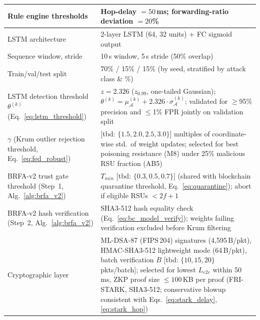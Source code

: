 \documentclass[12pt, a4paper]{report}
\begin{document}
{{\begin{longtable}{|m{5.0cm}|m{9.0cm}|}
            \hline
            Rule engine thresholds & Hop-delay $= 50$\,ms; forwarding-ratio deviation $= 20$\% \\
            \hline
            LSTM architecture & 2-layer LSTM (64, 32 units) + FC sigmoid output \\
            \hline
            Sequence window, stride & 10\,s window, 5\,s stride (50\% overlap) \\
            \hline
            Train/val/test split & 70\% / 15\% / 15\% (by seed, stratified by attack class \& \%) \\
            \hline
            LSTM detection threshold $\theta^{(k)}$ (Eq.~\ref{eq:lstm_threshold}) &
            $z = 2.326$ ($z_{0.99}$, one-tailed Gaussian); $\theta^{(k)} = \mu_{\mathcal{A}}^{(k)} + 2.326 \cdot \sigma_{\mathcal{A}}^{(k)}$;
            validated for $\geq$95\% precision and $\leq$1\% FPR jointly on validation split \\            
            \hline
              $\gamma$ (Krum outlier rejection threshold, Eq.~\ref{eq:fed_robust}) & [tbd: $\{1.5, 2.0, 2.5, 3.0\}$] multiples of coordinate-wise std.\ of weight updates;   selected for best poisoning resistance (M8) under 25\% malicious RSU fraction (AB5) \\
            \hline
              BRFA-v2 trust gate threshold (Step~1, Alg.~\ref{alg:brfa_v2}) &              $T_{min}$ [tbd: $\{0.3, 0.5, 0.7\}$] (shared with blockchain quarantine threshold, Eq.~\ref{eq:quarantine}); abort if eligible RSUs $< 2f{+}1$ \\
             \hline
              BRFA-v2 hash verification (Step~2, Alg.~\ref{alg:brfa_v2}) &              SHA3-512 hash equality check (Eq.~\ref{eq:bc_model_verify}); weights failing
              verification excluded before Krum filtering \\
              \hline
            Cryptographic layer & ML-DSA-87 (FIPS\,204) signatures (4,595\,B/pkt),
            HMAC-SHA3-512 lightweight mode (64\,B/pkt),
            batch verification $B$ [tbd: $\{10, 15, 20\}$\,pkts/batch];
            selected for lowest $L_{e2e}$ within 50\,ms,  ZKP proof size  $\leq 100$\,KB per proof   (FRI-STARK, SHA3-512; conservative blowup
             consistent with Eqs.~\ref{eq:stark_delay},
            \ref{eq:stark_hop}) \\


\end{longtable}}}
\end{document}
